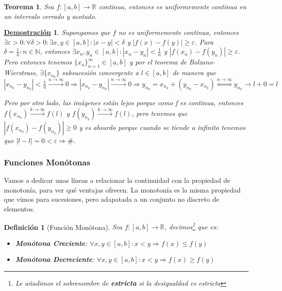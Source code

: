 \documentclass[10pt,a4paper,openright]{book}
\theoremstyle{break}
\newtheorem{defi}{Definición}[chapter]
\newtheorem{theo}{Teorema}[chapter]
\newtheorem*{demo}{\underline{Demostración}}
\begin{document}
\begin{theo}
Sea $f:[a,b]\rightarrow \mathbb R$ continua, entonces es uniformemente continua en un intervalo cerrado y acotado.
\end{theo}
\begin{demo}
Supongamos que $f$ no es uniformemente continua, entonces $\exists \varepsilon> 0: \forall \delta>0: \exists x,y\in [a,b]: |x-y|<\delta$ y $|f(x)-f(y)|\geq \varepsilon$. Para $\delta = \frac{1}{n}: n\in \mathbb N$, entonces $\exists x_n, y_n\in [a,b]: |x_n-y_n|<\frac{1}{n}$ y $|f(x_n)-f(y_n)|\geq \varepsilon$. Pero entonces tenemos $\{x_n\}_{n=1}^\infty\in [a,b]$ y por el teorema de Bolzano-Wierstrass, $\exists \{x_{n_k}\}$ subsucesión convergente a $l\in [a,b]$ de manera que $|x_{n_k}-y_{n_k}| < \frac{1}{n} \xrightarrow{n\rightarrow \infty} 0\Rightarrow |x_{n_k}-y_{n_k}|\xrightarrow{n\rightarrow \infty} 0\Rightarrow y_{n_k}=x_{n_k}+(y_{n_k}-x_{n_k})\stackrel{n\rightarrow \infty}{\Leftrightarrow} y_{n_k}\rightarrow l+0=l$

Pero por otro lado, las imágenes están lejos porque como f es continua, entonces $f(x_{n_k})\xrightarrow{k\rightarrow \infty}f(l)$ y $f(y_{n_k})\xrightarrow{k\rightarrow \infty}f(l)$, pero tenemos que $|f(x_{n_k})-f(y_{n_k})|\geq 0$ y es absurdo porque cuando se tiende a infinito tenemos que $|l-l|=0<\varepsilon\Rightarrow \#$.
\end{demo}

\subsubsection{Funciones Monótonas}
Vamos a dedicar unas líneas a relacionar la continuidad con la propiedad de monotonía, para ver qué ventajas ofrecen. La monotonía es la misma propiedad que vimos para sucesiones, pero adapatada a un conjunto no discreto de elementos.

\begin{defi}[Función Monótona]
Sea $f:[a,b]\rightarrow \mathbb R$, decimos\footnote{Le añadimos el sobrenombre de \textbf{estricta} si la desigualdad es estricta} que es:
\begin{itemize}
\item \textbf{Monótona Creciente}: $\forall x,y\in [a,b]: x<y\Rightarrow f(x)\leq f(y)$
\item \textbf{Monótona Decreciente}: $\forall x,y\in [a,b]: x<y\Rightarrow f(x)\geq f(y)$
\end{itemize}
\end{defi}
\end{document}
